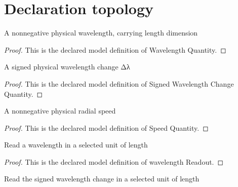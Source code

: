\section{Declaration topology}
\begin{definition}
  \label{def:physics:phyx-mini-0567:phyxminiproblems-problemphyxmini0567-wavelengthquantity}
  A nonnegative physical wavelength, carrying length dimension
\end{definition}
\begin{proof}
  This is the declared model definition of Wavelength Quantity.
\end{proof}
\begin{definition}
  \label{def:physics:phyx-mini-0567:phyxminiproblems-problemphyxmini0567-signedwavelengthchangequantity}
  A signed physical wavelength change Δλ
\end{definition}
\begin{proof}
  This is the declared model definition of Signed Wavelength Change Quantity.
\end{proof}
\begin{definition}
  \label{def:physics:phyx-mini-0567:phyxminiproblems-problemphyxmini0567-speedquantity}
  A nonnegative physical radial speed
\end{definition}
\begin{proof}
  This is the declared model definition of Speed Quantity.
\end{proof}
\begin{definition}
  \label{def:physics:phyx-mini-0567:phyxminiproblems-problemphyxmini0567-wavelengthreadout}
  Read a wavelength in a selected unit of length
\end{definition}
\begin{proof}
  This is the declared model definition of wavelength Readout.
\end{proof}
\begin{definition}
  \label{def:physics:phyx-mini-0567:phyxminiproblems-problemphyxmini0567-signedwavelengthchangereadout}
  Read the signed wavelength change in a selected unit of length
\end{definition}
